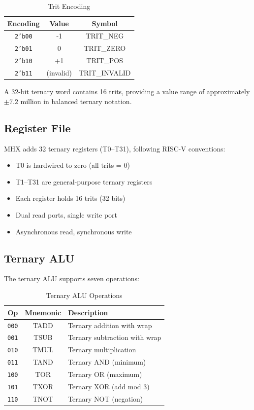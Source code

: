 \documentclass[conference,10pt]{IEEEtran}
\newcommand{\mhx}{\textsc{MHX\texttrademark}}
\newcommand{\riscv}{RISC-V}
\begin{document}
\begin{table}[h]
\centering
\caption{Trit Encoding}
\label{tab:trit_encoding}
\begin{tabular}{|c|c|c|}
\hline
\textbf{Encoding} & \textbf{Value} & \textbf{Symbol} \\
\hline
\texttt{2'b00} & -1 & TRIT\_NEG \\
\texttt{2'b01} & 0 & TRIT\_ZERO \\
\texttt{2'b10} & +1 & TRIT\_POS \\
\texttt{2'b11} & (invalid) & TRIT\_INVALID \\
\hline
\end{tabular}
\end{table}

A 32-bit ternary word contains 16 trits, providing a value range of approximately $\pm 7.2$ million in balanced ternary notation.

\subsection{Register File}

\mhx{} adds 32 ternary registers (T0--T31), following \riscv{} conventions:

\begin{itemize}
    \item T0 is hardwired to zero (all trits = 0)
    \item T1--T31 are general-purpose ternary registers
    \item Each register holds 16 trits (32 bits)
    \item Dual read ports, single write port
    \item Asynchronous read, synchronous write
\end{itemize}

\subsection{Ternary ALU}

The ternary ALU supports seven operations:

\begin{table}[h]
\centering
\caption{Ternary ALU Operations}
\label{tab:ternary_ops}
\begin{tabular}{|c|c|l|}
\hline
\textbf{Op} & \textbf{Mnemonic} & \textbf{Description} \\
\hline
\texttt{000} & TADD & Ternary addition with wrap \\
\texttt{001} & TSUB & Ternary subtraction with wrap \\
\texttt{010} & TMUL & Ternary multiplication \\
\texttt{011} & TAND & Ternary AND (minimum) \\
\texttt{100} & TOR & Ternary OR (maximum) \\
\texttt{101} & TXOR & Ternary XOR (add mod 3) \\
\texttt{110} & TNOT & Ternary NOT (negation) \\
\hline
\end{tabular}
\end{table}
\end{document}
